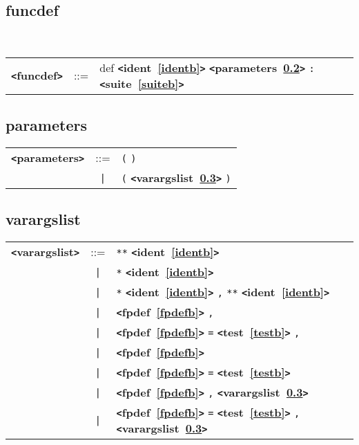 \documentclass[12pt]{article}
\begin{document}
\subsection{funcdef}
\label{funcdefb}
 \\

\begin{tabular}{lcl}
{\bf \verb+<+funcdef\verb+>+} & ::=  & def {\bf \verb+<+ident~\ref{identb}\verb+>+}  {\bf \verb+<+parameters~\ref{parametersb}\verb+>+}  \verb|:| {\bf \verb+<+suite~\ref{suiteb}\verb+>+}  \\
\end{tabular}

\subsection{parameters}
\label{parametersb}
\begin{tabular}{lcl}
{\bf \verb+<+parameters\verb+>+} & ::=  & \verb|(| \verb|)| \\
 & \verb+|+  & \verb|(| {\bf \verb+<+varargslist~\ref{varargslistb}\verb+>+}  \verb|)| \\
\end{tabular}

\subsection{varargslist}
\label{varargslistb}
\begin{tabular}{lcl}
{\bf \verb+<+varargslist\verb+>+} & ::=  & \verb|**| {\bf \verb+<+ident~\ref{identb}\verb+>+}  \\
 & \verb+|+  & \verb|*| {\bf \verb+<+ident~\ref{identb}\verb+>+}  \\
 & \verb+|+  & \verb|*| {\bf \verb+<+ident~\ref{identb}\verb+>+}  \verb|,| \verb|**| {\bf \verb+<+ident~\ref{identb}\verb+>+}  \\
 & \verb+|+  & {\bf \verb+<+fpdef~\ref{fpdefb}\verb+>+}  \verb|,| \\
 & \verb+|+  & {\bf \verb+<+fpdef~\ref{fpdefb}\verb+>+}  \verb|=| {\bf \verb+<+test~\ref{testb}\verb+>+}  \verb|,| \\
 & \verb+|+  & {\bf \verb+<+fpdef~\ref{fpdefb}\verb+>+}  \\
 & \verb+|+  & {\bf \verb+<+fpdef~\ref{fpdefb}\verb+>+}  \verb|=| {\bf \verb+<+test~\ref{testb}\verb+>+}  \\
 & \verb+|+  & {\bf \verb+<+fpdef~\ref{fpdefb}\verb+>+}  \verb|,| {\bf \verb+<+varargslist~\ref{varargslistb}\verb+>+}  \\
 & \verb+|+  & {\bf \verb+<+fpdef~\ref{fpdefb}\verb+>+}  \verb|=| {\bf \verb+<+test~\ref{testb}\verb+>+}  \verb|,| {\bf \verb+<+varargslist~\ref{varargslistb}\verb+>+}  \\
\end{tabular} \\
\end{document}

